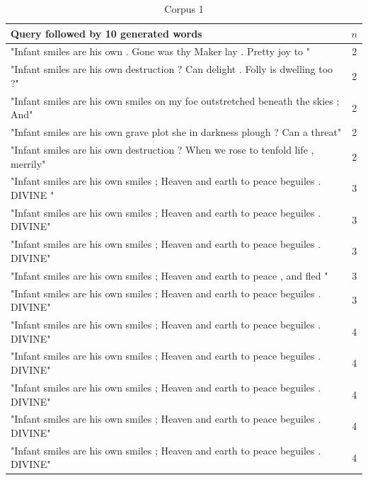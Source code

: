 \documentclass[a4paper,12pt]{article}
\begin{document}
\begin{table}
\begin{tabular}{| l |c|}
\hline
Query followed by 10 generated words & $n$ \\ \hline
"Infant smiles are his own . Gone was thy Maker lay . Pretty joy to " & 2\\ \hline
"Infant smiles are his own destruction ? Can delight . Folly is dwelling too ?"& 2 \\ \hline
"Infant smiles are his own smiles on my foe outstretched beneath the skies ; And" & 2 \\ \hline
"Infant smiles are his own grave plot she in darkness plough ? Can a threat" & 2 \\ \hline
"Infant smiles are his own destruction ? When we rose to tenfold life , merrily" & 2 \\ \hline

"Infant smiles are his own smiles ; Heaven and earth to peace beguiles . DIVINE " & 3 \\ \hline
"Infant smiles are his own smiles ; Heaven and earth to peace beguiles . DIVINE" & 3 \\ \hline
"Infant smiles are his own smiles ; Heaven and earth to peace beguiles . DIVINE" & 3 \\ \hline
"Infant smiles are his own smiles ; Heaven and earth to peace , and fled " & 3 \\ \hline
"Infant smiles are his own smiles ; Heaven and earth to peace beguiles . DIVINE" & 3 \\ \hline

"Infant smiles are his own smiles ; Heaven and earth to peace beguiles . DIVINE" & 4 \\ \hline
"Infant smiles are his own smiles ; Heaven and earth to peace beguiles . DIVINE" & 4 \\ \hline
"Infant smiles are his own smiles ; Heaven and earth to peace beguiles . DIVINE" & 4 \\ \hline
"Infant smiles are his own smiles ; Heaven and earth to peace beguiles . DIVINE" & 4 \\ \hline
"Infant smiles are his own smiles ; Heaven and earth to peace beguiles . DIVINE" & 4 \\ \hline
\end{tabular}
\caption{ Corpus 1}
\label{tab:corpus1}
\end{table}
\end{document}
